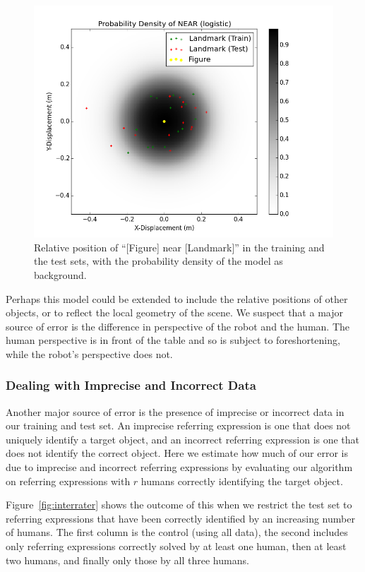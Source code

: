 \documentclass[conference]{IEEEtran}
\numberwithin{equation}{section}
\begin{document}
\begin{figure}[h!tb]
  \centering
    \includegraphics[width=1.1\columnwidth]{near_train_test_comp}
  \caption{Relative position of ``[Figure] near [Landmark]'' in the training and the test sets, with the probability density of the model as background.}
  \label{fig:near_comp}
\end{figure}

Perhaps this model could be extended to include the relative positions of other objects, or to reflect the local geometry of the scene. We suspect that a major source of error is the difference in perspective of the robot and the human. The human perspective is in front of the table and so is subject to foreshortening, while the robot's perspective does not.

\subsubsection{Dealing with Imprecise and Incorrect Data}

Another major source of error is the presence of imprecise or incorrect data in our training and test set. An imprecise referring expression is one that does not uniquely identify a target object, and an incorrect referring expression is one that does not identify the correct object. Here we estimate how much of our error is due to imprecise and incorrect referring expressions by evaluating our algorithm on referring expressions with $r$ humans correctly identifying the target object.

Figure~\ref{fig:interrater} shows the outcome of this when we restrict the test set to referring expressions that have been correctly identified by an increasing number of humans. The first column is the control (using all data), the second includes only referring expressions correctly solved by at least one human, then at least two humans, and finally only those by all three humans.
\end{document}
